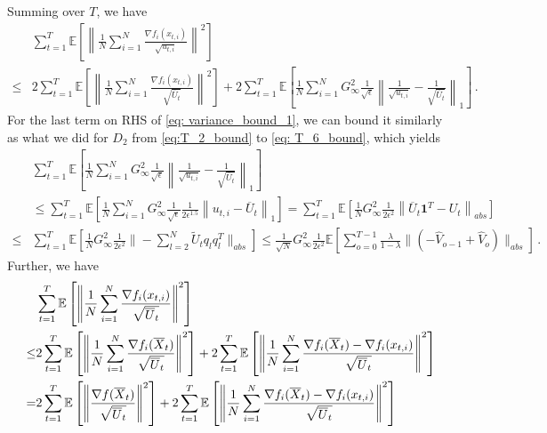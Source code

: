 \documentclass[anon,12pt]{colt2021} %
\begin{document}
Summing over $T$, we have
\begin{align}\label{eq: variance_bound_1}
&\sum_{t=1}^T \mathbb E \left[  \left\| \frac{1}{N} \sum_{i=1}^N \frac{\nabla f_i(x_{t,i})}{\sqrt{u_{t,i}}} \right\|^2     \right]   \nonumber \\
\leq & 2\sum_{t=1}^T \mathbb E \left[  \left\|\frac{1}{N} \sum_{i=1}^N \frac{\nabla f_i(x_{t,i})}{\sqrt{\overline U_t}  } \right\|^2 \right] + 2 \sum_{t=1}^T \mathbb E \left[  \frac{1}{N} \sum_{i=1}^N G_{\infty}^2  \frac{1}{\sqrt{\epsilon}}\left\|     \frac{1}{\sqrt{u_{t,i}}} - \frac{1}{\sqrt{\overline U_{t}}}  \right\|_1     \right] \, .
\end{align}
For the last term on RHS of \eqref{eq: variance_bound_1}, we can bound it similarly as what we did for $D_2$ from \eqref{eq:T_2_bound} to \eqref{eq: T_6_bound}, which yields
\begin{align}\label{eq: diff_u}
& \sum_{t=1}^T \mathbb E \left[  \frac{1}{N} \sum_{i=1}^N G_{\infty}^2  \frac{1}{\sqrt{\epsilon}}\left\|     \frac{1}{\sqrt{u_{t,i}}} - \frac{1}{\sqrt{\overline U_{t}}}  \right\|_1     \right] \\
&  \leq  \sum_{t=1}^T \mathbb E \left[  \frac{1}{N} \sum_{i=1}^N G_{\infty}^2  \frac{1}{\sqrt{\epsilon}} \frac{1}{2\epsilon^{1.5}} \left\|  u_{t,i} -    \overline U_{t}  \right\|_1     \right] = \sum_{t=1}^T \mathbb E \left[  \frac{1}{N}  G_{\infty}^2 \frac{1}{2\epsilon^2} \left\|     \overline U_{t} \mathbf 1^T - U_{t}  \right\|_{abs}    \right]  \nonumber \\
\leq & \sum_{t=1}^T \mathbb E \left[  \frac{1}{N}  G_{\infty}^2 \frac{1}{2\epsilon^2} \| - \sum_{l=2}^N   \tilde U_t q_l q_l^T \|_{abs}    \right] \leq  \frac{1}{\sqrt{N}}  G_{\infty}^2 \frac{1}{2\epsilon^2}   \mathbb E \left[   \sum_{o=0}^{T-1} \frac{\lambda}{1-\lambda}     \|    (- \hat V_{o-1} + \hat V_{o} ) \|_{abs}    \right] \, .
\end{align}
Further, we have 
\begin{align}\notag
\begin{split}
&\sum_{t=1}^T \mathbb E \left[  \left\|\frac{1}{N} \sum_{i=1}^N \frac{\nabla f_i(x_{t,i})}{\sqrt{\overline U_t}  } \right\|^2 \right]   \\
\leq & 2 \sum_{t=1}^T \mathbb E \left[  \left\|\frac{1}{N} \sum_{i=1}^N \frac{\nabla f_i(\overline X_{t})}{\sqrt{\overline U_t}  } \right\|^2 \right] + 2 \sum_{t=1}^T \mathbb E \left[  \left\|\frac{1}{N} \sum_{i=1}^N \frac{\nabla f_i(\overline X_t) - \nabla f_i(x_{t,i})}{\sqrt{\overline U_t}  } \right\|^2 \right]  \\
= & 2 \sum_{t=1}^T \mathbb E \left[  \left\| \frac{\nabla f(\overline X_{t})}{\sqrt{\overline U_t}  } \right\|^2 \right] + 2 \sum_{t=1}^T \mathbb E \left[  \left\|\frac{1}{N} \sum_{i=1}^N \frac{\nabla f_i(\overline X_t) - \nabla f_i(x_{t,i})}{\sqrt{\overline U_t}  } \right\|^2 \right] 
\end{split}
\end{align}
\end{document}
